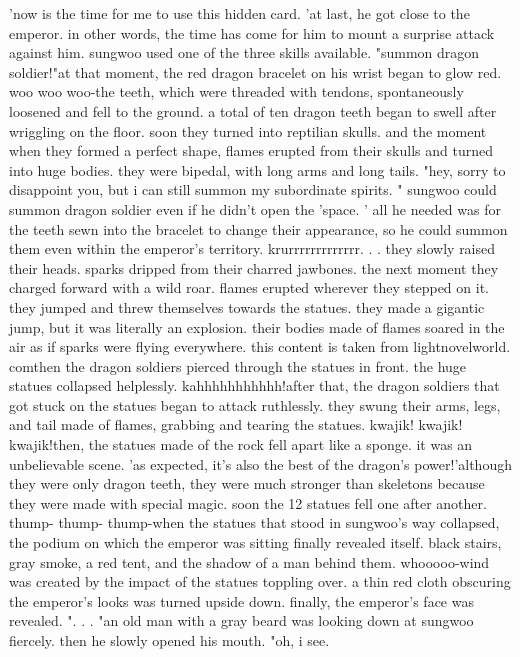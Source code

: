 'now is the time for me to use this hidden card.
'at last, he got close to the emperor.
 in other words, the time has come for him to mount a surprise attack against him.
sungwoo used one of the three skills available.
"summon dragon soldier!"at that moment, the red dragon bracelet on his wrist began to glow red.
woo woo woo-the teeth, which were threaded with tendons, spontaneously loosened and fell to the ground.
 a total of ten dragon teeth began to swell after wriggling on the floor.
soon they turned into reptilian skulls.
 and the moment when they formed a perfect shape, flames erupted from their skulls and turned into huge bodies.
 they were bipedal, with long arms and long tails.
"hey, sorry to disappoint you, but i can still summon my subordinate spirits.
"
sungwoo could summon dragon soldier even if he didn't open the 'space.
' all he needed was for the teeth sewn into the bracelet to change their appearance, so he could summon them even within the emperor's territory.
krurrrrrrrrrrrrr.
.
.
they slowly raised their heads.
 sparks dripped from their charred jawbones.
 the next moment they charged forward with a wild roar.
 flames erupted wherever they stepped on it.
 they jumped and threw themselves towards the statues.
they made a gigantic jump, but it was literally an explosion.
 their bodies made of flames soared in the air as if sparks were flying everywhere.
this content is taken from lightnov‌elworld.
c‌omthen the dragon soldiers pierced through the statues in front.
 the huge statues collapsed helplessly.
kahhhhhhhhhhh!after that, the dragon soldiers that got stuck on the statues began to attack ruthlessly.
 they swung their arms, legs, and tail made of flames, grabbing and tearing the statues.
kwajik! kwajik! kwajik!then, the statues made of the rock fell apart like a sponge.
 it was an unbelievable scene.
 'as expected, it's also the best of the dragon's power!'although they were only dragon teeth, they were much stronger than skeletons because they were made with special magic.
 soon the 12 statues fell one after another.
thump- thump- thump-when the statues that stood in sungwoo's way collapsed, the podium on which the emperor was sitting finally revealed itself.
 black stairs, gray smoke, a red tent, and the shadow of a man behind them.
whooooo-wind was created by the impact of the statues toppling over.
 a thin red cloth obscuring the emperor's looks was turned upside down.
 finally, the emperor's face was revealed.
".
.
.
"an old man with a gray beard was looking down at sungwoo fiercely.
 then he slowly opened his mouth.
"oh, i see.
